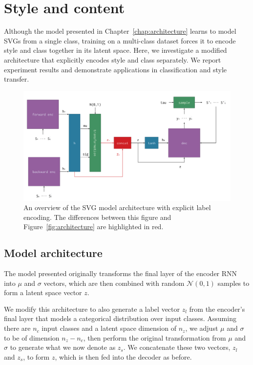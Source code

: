 \chapter{Style and content}\label{chap:style}
Although the model presented in Chapter~\ref{chap:architecture} learns to model SVGs from a single class, training on a multi-class dataset forces it to encode style and class together in its latent space.
Here, we investigate a modified architecture that explicitly encodes style and class separately.
We report experiment results and demonstrate applications in classification and style transfer.

\begin{figure}[h]
\centering
\caption[An overview of the SVG model architecture with explicit label encoding]
    {An overview of the SVG model architecture with explicit label encoding.
    The differences between this figure and Figure~\ref{fig:architecture} are highlighted in red.
\label{fig:label-arch}}
\includegraphics[width=\textwidth]{figures/label_architecture}
\end{figure}

\section{Model architecture}\label{sec:mod-arch}

The model presented originally transforms the final layer of the encoder RNN into $\mu$ and $\sigma$ vectors, which are then combined with random $\mathcal{N}(0,1)$ samples to form a latent space vector $z$.

We modify this architecture to also generate a label vector $z_l$ from the encoder's final layer that models a categorical distribution over input classes.
Assuming there are $n_c$ input classes and a latent space dimension of $n_z$, we adjust $\mu$ and $\sigma$ to be of dimension $n_z - n_c$, then perform the original transformation from $\mu$ and $\sigma$ to generate what we now denote as $z_s$.
We concatenate these two vectors, $z_l$ and $z_s$, to form $z$, which is then fed into the decoder as before.


